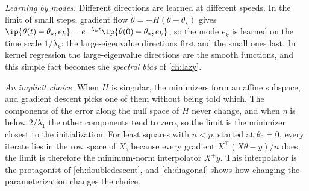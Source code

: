 \begin{refsection}
\emph{Learning by modes.} Different directions are learned at different speeds. In the limit of small steps, gradient flow $\dot\theta=-H(\theta-\theta_\star)$ gives $\ip{\theta(t)-\theta_\star,e_k}=e^{-\lambda_kt}\ip{\theta(0)-\theta_\star,e_k}$, so the mode $e_k$ is learned on the time scale $1/\lambda_k$: the large-eigenvalue directions first and the small ones last. In kernel regression the large-eigenvalue directions are the smooth functions, and this simple fact becomes the \emph{spectral bias} of \cref{ch:lazy}.

\emph{An implicit choice.} When $H$ is singular, the minimizers form an affine subspace, and gradient descent picks one of them without being told which. The components of the error along the null space of $H$ never change, and when $\eta$ is below $2/\lambda_1$ the other components tend to zero, so the limit is the minimizer closest to the initialization. For least squares with $n<p$, started at $\theta_0=0$, every iterate lies in the row space of $X$, because every gradient $X^\top(X\theta-y)/n$ does; the limit is therefore the minimum-norm interpolator $X^+y$. This interpolator is the protagonist of \cref{ch:doubledescent}, and \cref{ch:diagonal} shows how changing the parameterization changes the choice.


\end{refsection}
